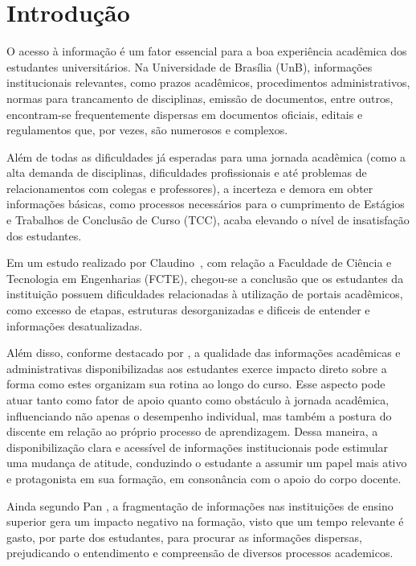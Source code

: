 \chapter[Introdução]{Introdução}

O acesso à informação é um fator essencial para a boa experiência acadêmica dos estudantes universitários. Na Universidade de Brasília (UnB), informações institucionais relevantes, como prazos acadêmicos, procedimentos administrativos, normas para trancamento de disciplinas, emissão de documentos, entre outros, encontram-se frequentemente dispersas em documentos oficiais, editais e regulamentos que, por vezes, são numerosos e complexos.                                                                        

Além de todas as dificuldades já esperadas para uma jornada acadêmica (como a alta demanda de disciplinas, dificuldades profissionais e até problemas de relacionamentos com colegas e professores), a incerteza e demora em obter informações básicas, como processos necessários para o cumprimento de Estágios e Trabalhos de Conclusão de Curso (TCC), acaba elevando o nível de insatisfação dos estudantes. 

Em um estudo realizado por Claudino~\cite{claudino2023chatbot}, com relação a Faculdade de Ciência e Tecnologia em Engenharias (FCTE), chegou-se a conclusão que os estudantes da instituição possuem dificuldades relacionadas à utilização de portais acadêmicos, como excesso de etapas, estruturas desorganizadas e dificeis de entender e informações desatualizadas.

Além disso, conforme destacado por \cite{lorena2019informacao}, a qualidade das informações acadêmicas e administrativas disponibilizadas aos estudantes exerce impacto direto sobre a forma como estes organizam sua rotina ao longo do curso. Esse aspecto pode atuar tanto como fator de apoio quanto como obstáculo à jornada acadêmica, influenciando não apenas o desempenho individual, mas também a postura do discente em relação ao próprio processo de aprendizagem. Dessa maneira, a disponibilização clara e acessível de informações institucionais pode estimular uma mudança de atitude, conduzindo o estudante a assumir um papel mais ativo e protagonista em sua formação, em consonância com o apoio do corpo docente.

Ainda segundo Pan \cite{pan2024fragmentation}, a fragmentação de informações nas instituições de ensino superior gera um impacto negativo na formação, visto que um tempo relevante é gasto, por parte dos estudantes, para procurar as informações dispersas, prejudicando o entendimento e compreensão de diversos processos academicos. 

